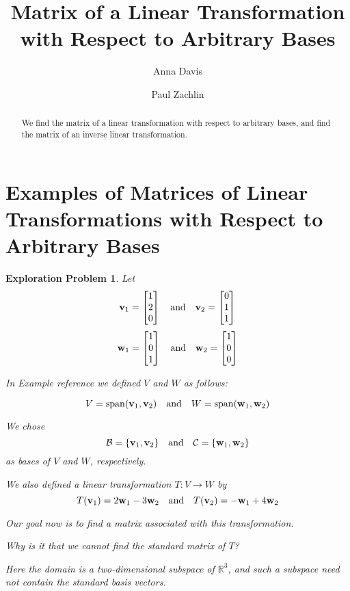 \documentclass{ximera}
\author{Anna Davis \and Paul Zachlin} \title{Matrix of a Linear Transformation with Respect to Arbitrary Bases} \license{CC-BY 4.0}
\renewcommand{\vec}[1]{{\bf #1}}
\newcommand{\RR}{\mathbb{R}}
\newtheorem{initprob}{Exploration Problem}
\begin{document}
\begin{abstract}
  We find the matrix of a linear transformation with respect to arbitrary bases, and find the matrix of an inverse linear transformation.
\end{abstract}
\maketitle

\section*{Examples of Matrices of Linear Transformations with Respect to  Arbitrary Bases}

\begin{initprob}\label{init:matlintransgeneral}
Let
$$\vec{v}_1=\begin{bmatrix}1\\2\\0\end{bmatrix}\quad\text{and}\quad\vec{v}_2=\begin{bmatrix}0\\1\\1\end{bmatrix}$$
$$\vec{w}_1=\begin{bmatrix}1\\0\\1\end{bmatrix}\quad\text{and}\quad\vec{w}_2=\begin{bmatrix}1\\0\\0\end{bmatrix}$$

In Example {\color{red} reference} we defined $V$ and $W$ as follows:

$$V=\text{span}(\vec{v}_1, \vec{v}_2)\quad\text{and}\quad W=\text{span}(\vec{w}_1, \vec{w}_2)$$

We chose
$$\mathcal{B}=\{\vec{v}_1, \vec{v}_2\}\quad\text{and}\quad\mathcal{C}=\{\vec{w}_1, \vec{w}_2\}$$
as bases of $V$ and $W$, respectively.

We also defined a linear transformation $T:V\rightarrow W$ by 
$$T(\vec{v}_1)=2\vec{w}_1-3\vec{w}_2\quad\text{and} \quad T(\vec{v}_2)=-\vec{w}_1+4\vec{w}_2$$

Our goal now is to find a matrix associated with this transformation.  

Why is it that we cannot find the standard matrix of $T$?\begin{hint}{Here the domain is a two-dimensional subspace of $\RR^3$, and such a subspace need not contain the standard basis vectors.}\end{hint} 


\end{initprob}
\end{document}
